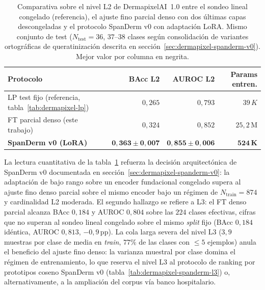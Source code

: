 \begin{table}[H]
\centering
\footnotesize
\setlength{\tabcolsep}{4pt}
\renewcommand{\arraystretch}{0.95}
\caption{Comparativa sobre el nivel L2 de DermapixelAI~1.0 entre el
sondeo lineal congelado (referencia), el ajuste fino parcial denso
con dos últimas capas descongeladas y el protocolo SpanDerm v0 con
adaptación LoRA. Mismo conjunto de test ($N_{\mathrm{test}} = 36$,
$37$--$38$ clases según consolidación de variantes ortográficas
de queratinización descrita en
secci\'on~\ref{sec:dermapixel-spanderm-v0}). Mejor valor por
columna en negrita.}
\label{tab:dermapixel-ft-vs-lora}
\begin{tabular}{lrrr}
\hline
Protocolo                       & BAcc L2                         & AUROC L2                       & Params entren. \\
\hline
LP test fijo (referencia, tabla~\ref{tab:dermapixel-lp}) & $0{,}265$                       & $0{,}793$                      & $39\,K$ \\
FT parcial denso (este trabajo) & $0{,}324$                       & $0{,}852$                      & $25{,}2$\,M \\
\textbf{SpanDerm v0 (LoRA)}     & $\mathbf{0{,}363 \pm 0{,}007}$  & $\mathbf{0{,}855 \pm 0{,}006}$ & $\mathbf{524\,K}$ \\
\hline
\end{tabular}
\end{table}

La lectura cuantitativa de la tabla~\ref{tab:dermapixel-ft-vs-lora}
refuerza la decisión arquitectónica de SpanDerm v0 documentada en
secci\'on~\ref{sec:dermapixel-spanderm-v0}: la adaptación de bajo
rango sobre un encoder fundacional congelado supera al ajuste fino
denso parcial sobre el mismo encoder bajo un régimen de
$N_{\mathrm{train}} = 874$ y cardinalidad L2 moderada. El segundo
hallazgo se refiere a L3: el FT denso parcial alcanza BAcc
$0{,}184$ y AUROC $0{,}804$ sobre las $224$ clases efectivas,
cifras que no superan al sondeo lineal congelado sobre el mismo
\emph{split} fijo (BAcc $0{,}184$ idéntica, AUROC $0{,}813$,
$-0{,}9$\,pp). La cola larga severa del nivel L3 ($3{,}9$
muestras por clase de media en \emph{train}, $77\%$ de las
clases con $\leq 5$ ejemplos) anula el beneficio del ajuste fino
denso: la varianza muestral por clase domina el régimen de
entrenamiento, lo que reserva el nivel L3 al protocolo de ranking
por prototipos coseno SpanDerm v0
(tabla~\ref{tab:dermapixel-spanderm-l3}) o, alternativamente, a la
ampliación del corpus vía banco hospitalario.


